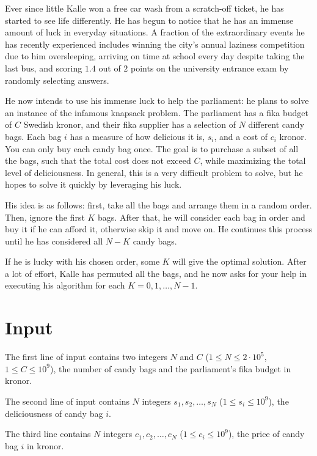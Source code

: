 
\noindent
Ever since little Kalle won a free car wash from a scratch-off ticket, he has started to see life differently.
He has begun to notice that he has an immense amount of luck in everyday situations.
A fraction of the extraordinary events he has recently experienced includes winning the city's annual laziness
competition due to him oversleeping, arriving on time at school every day despite taking the last bus,
and scoring $1.4$ out of $2$ points on the university entrance exam by randomly selecting answers.

He now intends to use his immense luck to help the parliament: he plans to solve an instance of the infamous knapsack problem.
The parliament has a fika budget of $C$ Swedish kronor, and their fika supplier has a selection of $N$ different candy bags.
Each bag $i$ has a measure of how delicious it is, $s_i$, and a cost of $c_i$ kronor. You can only buy each candy bag once.
The goal is to purchase a subset of all the bags, such that the total cost does not exceed $C$, while maximizing the total
level of deliciousness. In general, this is a very difficult problem to solve, but he hopes to solve it quickly by
leveraging his luck.

His idea is as follows: first, take all the bags and arrange them in a random order. Then, ignore the first $K$ bags.
After that, he will consider each bag in order and buy it if he can afford it, otherwise skip it and move on.
He continues this process until he has considered all $N-K$ candy bags.

If he is lucky with his chosen order, some $K$ will give the optimal solution. After a lot of effort, Kalle has permuted
all the bags, and he now asks for your help in executing his algorithm for each $K=0,1,\dots,N-1$.

\section*{Input}
The first line of input contains two integers $N$ and $C$ ($1 \leq N \leq 2 \cdot 10^5$, $1 \leq C \leq 10^9$), the
number of candy bags and the parliament's fika budget in kronor.

The second line of input contains $N$ integers $s_1, s_2, \dots, s_N$ ($1 \leq s_i \leq 10^9$), the deliciousness of candy bag $i$.

The third line contains $N$ integers $c_1, c_2, \dots, c_N$ ($1 \leq c_i \leq 10^9$), the price of candy bag $i$ in kronor.

